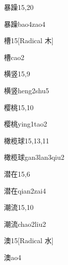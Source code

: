 \begin{entry}{暴躁}{15,20}
  \begin{phonetics}{暴躁}{bao4zao4}
  \end{phonetics}
\end{entry}

\begin{entry}{槽}{15}[Radical ⽊]
  \begin{phonetics}{槽}{cao2}
  \end{phonetics}
\end{entry}

\begin{entry}{横竖}{15,9}
  \begin{phonetics}{横竖}{heng2shu5}
  \end{phonetics}
\end{entry}

\begin{entry}{樱桃}{15,10}
  \begin{phonetics}{樱桃}{ying1tao2}
  \end{phonetics}
\end{entry}

\begin{entry}{橄榄球}{15,13,11}
  \begin{phonetics}{橄榄球}{gan3lan3qiu2}
  \end{phonetics}
\end{entry}

\begin{entry}{潜在}{15,6}
  \begin{phonetics}{潜在}{qian2zai4}
  \end{phonetics}
\end{entry}

\begin{entry}{潮流}{15,10}
  \begin{phonetics}{潮流}{chao2liu2}
  \end{phonetics}
\end{entry}

\begin{entry}{澳}{15}[Radical 水]
  \begin{phonetics}{澳}{ao4}
  \end{phonetics}
\end{entry}

